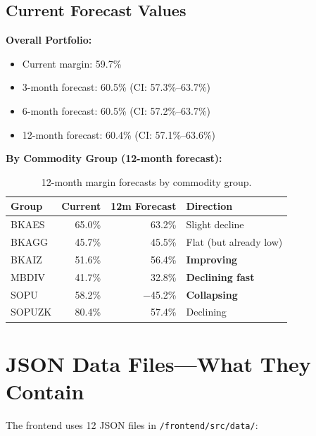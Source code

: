 \documentclass[11pt,a4paper]{article}
\newcommand{\code}[1]{\texttt{#1}}
\begin{document}
\subsection{Current Forecast Values}

\textbf{Overall Portfolio:}
\begin{itemize}[nosep]
  \item Current margin: 59.7\%
  \item 3-month forecast: 60.5\% (CI: 57.3\%--63.7\%)
  \item 6-month forecast: 60.5\% (CI: 57.2\%--63.7\%)
  \item 12-month forecast: 60.4\% (CI: 57.1\%--63.6\%)
\end{itemize}

\textbf{By Commodity Group (12-month forecast):}
\begin{table}[H]
\centering
\begin{tabular}{lrrl}
\toprule
\textbf{Group} & \textbf{Current} & \textbf{12m Forecast} & \textbf{Direction} \\
\midrule
BKAES  & 65.0\% & 63.2\%  & Slight decline \\
BKAGG  & 45.7\% & 45.5\%  & Flat (but already low) \\
BKAIZ  & 51.6\% & 56.4\%  & \textbf{Improving} \\
MBDIV  & 41.7\% & 32.8\%  & \textbf{Declining fast} \\
SOPU   & 58.2\% & $-$45.2\% & \textbf{Collapsing} \\
SOPUZK & 80.4\% & 57.4\%  & Declining \\
\bottomrule
\end{tabular}
\caption{12-month margin forecasts by commodity group.}
\end{table}

\section{JSON Data Files---What They Contain}

The frontend uses 12 JSON files in \code{/frontend/src/data/}:
\end{document}
